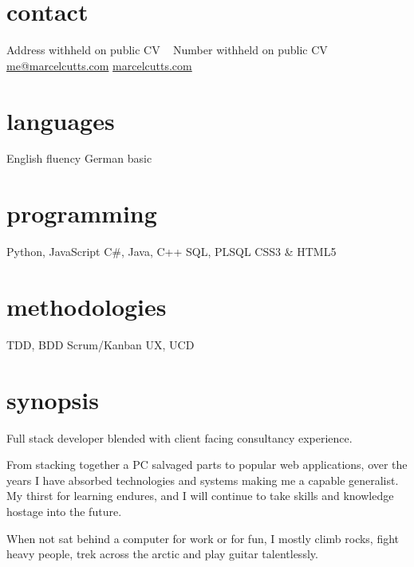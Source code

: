 \documentclass[]{friggeri-cv} %
\begin{document}


\begin{aside} %
\section{contact}
Address withheld on public CV
~
Number withheld on public CV
~
\href{mailto:me@marcelcutts.com}{me@marcelcutts.com}
\href{http://www.marcelcutts.com}{marcelcutts.com}
\section{languages}
English fluency
German basic
\section{programming}
Python, JavaScript
C\#, Java, C++
SQL, PLSQL
CSS3 \& HTML5
\section{methodologies}
TDD, BDD
Scrum/Kanban
UX, UCD
\end{aside}


\section{synopsis}

Full stack developer blended with client facing consultancy experience.

From stacking together a PC salvaged parts to popular web applications, over the years I have absorbed technologies and systems making me a capable generalist. My thirst for learning endures, and I will continue to take skills and knowledge hostage into the future. 

When not sat behind a computer for work or for fun, I mostly climb rocks, fight heavy people, trek across the arctic and play guitar talentlessly.
\end{document}
